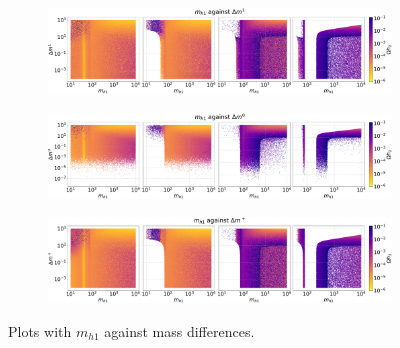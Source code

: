 \documentclass[12pt]{article}
\begin{document}
\begin{figure}[H]
    \begin{subfigure}[b]{\columnwidth}
      \centering
      \includegraphics[width=1\columnwidth]{4plot/MD1_DM2.pdf}
    \end{subfigure}
    
    \begin{subfigure}[b]{\columnwidth}
      \centering
      \includegraphics[width=1\columnwidth]{4plot/MD1_DM3.pdf}
    \end{subfigure}

    \begin{subfigure}[b]{\columnwidth}
      \centering
      \includegraphics[width=1\columnwidth]{4plot/MD1_DMP.pdf}
    \end{subfigure}
    \caption{Plots with $m_{h1}$ against mass differences.}
\end{figure}
\end{document}

